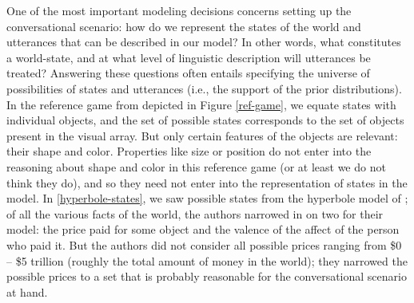 \documentclass[10pt,letterpaper]{article}
\begin{document}


One of the most important modeling decisions concerns setting up the conversational scenario: how do we represent the states of the world and utterances that can be described in our model? In other words, what constitutes a world-state, and at what level of linguistic description will utterances be treated? Answering these questions often entails specifying the universe of possibilities of states and utterances (i.e., the support of the prior distributions).
In the reference game from \cite{frankgoodman2012} depicted in Figure \ref{ref-game}, we equate states with individual objects, and the set of possible states corresponds to the set of objects present in the visual array. But only certain features of the objects are relevant: their shape and color. Properties like size or position do not enter into the reasoning about shape and color in this reference game (or at least we do not think they do), and so they need not enter into the representation of states in the model. In \ref{hyperbole-states}, we saw possible states from the hyperbole model of \cite{kaoetal2014}; of all the various facts of the world, the authors narrowed in on two for their model: the price paid for some object and the valence of the affect of the person who paid it. 
But the authors did not consider all possible prices ranging from \$0  -- \$5 trillion (roughly the total amount of money in the world); they narrowed the possible prices to a set that is probably reasonable for the conversational scenario at hand.
\end{document}
